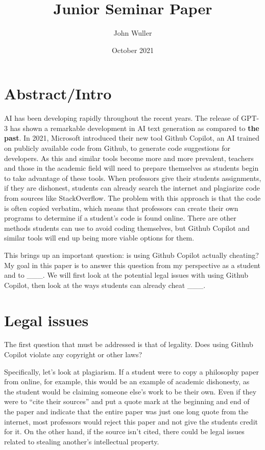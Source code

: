 \documentclass{article}
\title{Junior Seminar Paper}
\author{John Wuller}
\date{October 2021}
\begin{document}
\maketitle


\section{Abstract/Intro}

AI has been developing rapidly throughout the recent years. The release of GPT-3 has shown a remarkable development in AI text generation as compared to \textbf{the past}. In 2021, Microsoft introduced their new tool Github Copilot, an AI trained on publicly available code from Github, to generate code suggestions for developers. As this and similar tools become more and more prevalent, teachers and those in the academic field will need to prepare themselves as students begin to take advantage of these tools. When professors give their students assignments, if they are dishonest, students can already search the internet and plagiarize code from sources like StackOverflow. The problem with this approach is that the code is often copied verbatim, which means that professors can create their own programs to determine if a student's code is found online. There are other methods students can use to avoid coding themselves, but Github Copilot and similar tools will end up being more viable options for them.

This brings up an important question: is using Github Copilot actually cheating? My goal in this paper is to answer this question from my perspective as a student and to \_\_\_. We will first look at the potential legal issues with using Github Copilot, then look at the ways students can already cheat \_\_\_.

\section{Legal issues}

The first question that must be addressed is that of legality. Does using Github Copilot violate any copyright or other laws?

Specifically, let's look at plagiarism. If a student were to copy a philosophy paper from online, for example, this would be an example of academic dishonesty, as the student would be claiming someone else's work to be their own. Even if they were to ``cite their sources'' and put a quote mark at the beginning and end of the paper and indicate that the entire paper was just one long quote from the internet, most professors would reject this paper and not give the students credit for it. On the other hand, if the source isn't cited, there could be legal issues related to stealing another's intellectual property.
\end{document}
